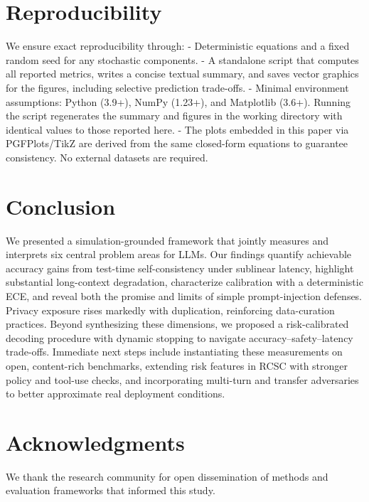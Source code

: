 \documentclass[10pt]{article}
\begin{document}
\section{Reproducibility}
We ensure exact reproducibility through:
- Deterministic equations and a fixed random seed for any stochastic components.
- A standalone script that computes all reported metrics, writes a concise textual summary, and saves vector graphics for the figures, including selective prediction trade-offs.
- Minimal environment assumptions: Python (3.9+), NumPy (1.23+), and Matplotlib (3.6+). Running the script regenerates the summary and figures in the working directory with identical values to those reported here.
- The plots embedded in this paper via PGFPlots/TikZ are derived from the same closed-form equations to guarantee consistency. No external datasets are required.

\section{Conclusion}
We presented a simulation-grounded framework that jointly measures and interprets six central problem areas for LLMs. Our findings quantify achievable accuracy gains from test-time self-consistency under sublinear latency, highlight substantial long-context degradation, characterize calibration with a deterministic ECE, and reveal both the promise and limits of simple prompt-injection defenses. Privacy exposure rises markedly with duplication, reinforcing data-curation practices. Beyond synthesizing these dimensions, we proposed a risk-calibrated decoding procedure with dynamic stopping to navigate accuracy–safety–latency trade-offs. Immediate next steps include instantiating these measurements on open, content-rich benchmarks, extending risk features in RCSC with stronger policy and tool-use checks, and incorporating multi-turn and transfer adversaries to better approximate real deployment conditions.

\section*{Acknowledgments}
We thank the research community for open dissemination of methods and evaluation frameworks that informed this study.
\end{document}
